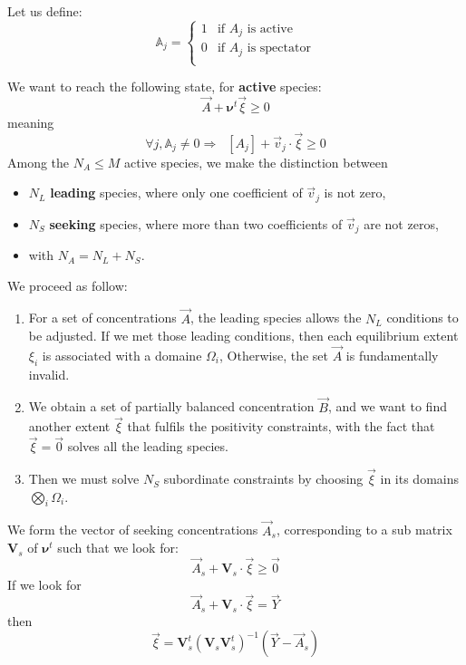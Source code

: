 \documentclass[aps,onecolumn,11pt]{revtex4}
\begin{document}
Let us define:
\begin{equation}
	\mathbb{A}_j = \left\lbrace
	\begin{array}{cl}
	1 & \text{if $A_j$ is active}\\
	0 & \text{if $A_j$ is spectator}\\
	\end{array}
	\right.
\end{equation}

We want to reach the following state, for \textbf{active} species:
\begin{equation}
	\vec{A} + \bm{\nu}^t \vec{\xi} \geq 0
\end{equation}
meaning
\begin{equation}
	\forall j, \mathbb{A}_j\not=0 \Rightarrow \;\; [A_j] + \vec{v}_j \cdot \vec{\xi} \geq 0
\end{equation}
Among the $N_A\leq M$ active species, we make the distinction between 
\begin{itemize}
\item  $N_L$ \textbf{leading} species, where only one coefficient of $\vec{v}_j$ is not zero,
\item  $N_S$ \textbf{seeking} species, where more than two coefficients of $\vec{v}_j$ are not zeros,
\item  with $N_A=N_L+N_S$.
\end{itemize}
We proceed as follow:
\begin{enumerate}
\item For a set of concentrations $\vec{A}$, the leading species allows the $N_L$ conditions to be adjusted.
If we met those leading conditions, then each equilibrium extent $\xi_i$ is associated with a domaine $\Omega_i$,
Otherwise, the set $\vec{A}$ is fundamentally invalid.

\item We obtain a set of partially balanced concentration $\vec{B}$, and we want to find another extent $\vec{\xi}$ that
fulfils the positivity constraints, with the fact that $\vec{\xi}=\vec{0}$ solves all the leading species.

\item Then we must solve $N_S$ subordinate constraints by choosing $\vec{\xi}$ in its domains $\bigotimes_i \Omega_i$.
\end{enumerate}

We form the vector of seeking concentrations $\vec{A}_s$, corresponding to a sub matrix $\bm{V}_s$ of $\bm{\nu}^t$
such that we look for:
\begin{equation}
	\vec{A}_s + \bm{V}_s \cdot \vec{\xi} \geq \vec{0}
\end{equation}
If we look for
\begin{equation}
	\vec{A}_s + \bm{V}_s \cdot \vec{\xi} = \vec{Y}
\end{equation} 
then
\begin{equation}
	\vec{\xi} =  \bm{V}_s^t \left(\bm{V}_s \bm{V}_s^t\right) ^{-1} \left( \vec{Y} - \vec{A}_s\right)
\end{equation}
   
\end{document}
